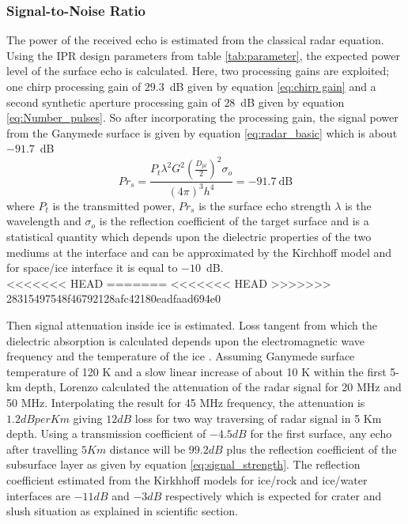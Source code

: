 \subsubsection{Signal-to-Noise Ratio}
%
The power of the received echo is estimated from the classical radar equation. Using the \ac{IPR} design parameters from table \ref{tab:parameter}, the expected power level of the surface echo is calculated. Here, two processing gains are exploited; one chirp processing gain of $29.3$~dB given by equation \ref{eq:chirp gain} and a second synthetic aperture processing gain of $28$~dB given by equation \ref{eq:Number_pulses}. So after incorporating the processing gain, the signal power from the Ganymede surface is given by equation \ref{eq:radar_basic} which is about $-91.7$~dB
%
\begin{equation}
Pr_{s} = \dfrac{P_{t}\lambda^{2}G^{2}(\frac{D_{pl}}{2})^{2}\sigma_{o}}{(4\pi)^{3}h^{4}} 
	  = -91.7 \mathrm{~dB} 
\label{eq:radar_basic}
\end{equation}
where $P_{t}$ is the transmitted power, $Pr_{s}$ is the surface echo strength $\lambda$ is the wavelength  and $\sigma_{o}$ is the reflection coefficient of the target surface and is a statistical quantity which depends upon the dielectric properties of the two mediums at the interface and can be approximated by the Kirchhoff model \cite{MIMOSA} and for space/ice interface it is equal to $-10$~dB.\\
%
<<<<<<< HEAD
=======
<<<<<<< HEAD
>>>>>>> 28315497548f46792128afc42180eadfaad694e0

Then signal attenuation inside ice is estimated. Loss tangent from which the dielectric absorption is calculated depends upon the electromagnetic wave frequency and the temperature of the ice \cite{MIMOSA}. Assuming Ganymede surface temperature of 120 K and a slow linear increase of about 10 K within the first 5-km depth, Lorenzo \cite{Gany_SRS} calculated the attenuation of the radar signal for 20 MHz and 50 MHz. Interpolating the result for 45 MHz frequency, the attenuation is $1.2 dB per Km$ giving $12 dB$ loss for two way traversing of radar signal in 5 Km depth. Using a transmission coefficient of $-4.5 dB$ for the first surface, any echo after travelling $5 Km $ distance will be $99.2 dB$ plus the reflection coefficient of the subsurface layer as given by equation \ref{eq:signal_strength}. The reflection coefficient estimated from the Kirkhhoff models for ice/rock and ice/water interfaces are $-11 dB$ and $-3 dB$ respectively which is expected for  crater and slush situation as explained in scientific section.

